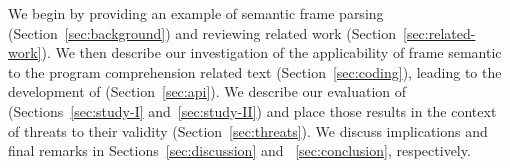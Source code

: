 We begin by providing an example of
semantic frame parsing (Section~\ref{sec:background})
and reviewing related work (Section~\ref{sec:related-work}).
We then describe our  investigation of
the applicability of frame semantic to the program
comprehension related text (Section~\ref{sec:coding}), leading to the development of \api{} (Section~\ref{sec:api}). We describe our evaluation of \api{} (Sections~\ref{sec:study-I} and~\ref{sec:study-II}) and place those results in the context of threats
to their validity (Section~\ref{sec:threats}).
We discuss implications and final remarks in Sections~\ref{sec:discussion} and ~\ref{sec:conclusion}, respectively.





